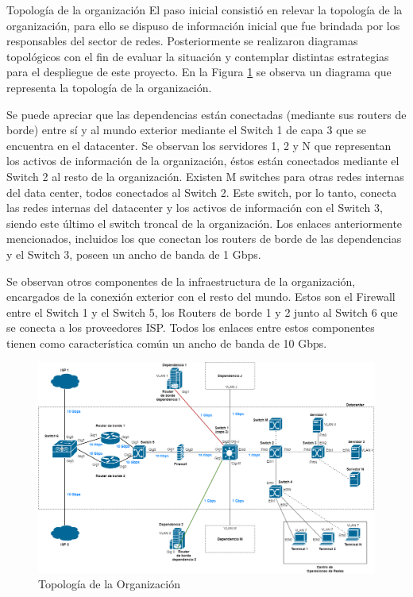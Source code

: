     \begin{section}{Topología de la organización}
    El paso inicial consistió en relevar la topología de la organización, para ello se dispuso de información inicial que fue brindada por los responsables del sector de redes. Posteriormente se realizaron diagramas topológicos con el fin de evaluar la situación y contemplar distintas estrategias para el despliegue de este proyecto.  
    En la Figura \ref{fig:iter1_top_unc} se observa un diagrama que representa la topología de la organización.\par
    Se puede apreciar que las dependencias están conectadas (mediante sus routers de borde) entre sí y al mundo exterior mediante el Switch 1 de capa 3 que se encuentra en el datacenter. Se observan los servidores 1, 2 y N que representan los activos de información de la organización, éstos están conectados mediante el Switch 2 al resto de la organización. Existen M switches para otras redes internas del data center, todos conectados al Switch 2. Este switch, por lo tanto, conecta las redes internas del datacenter y los activos de información con el Switch 3, siendo este último el switch troncal de la organización. Los enlaces anteriormente mencionados, incluidos los que conectan los routers de borde de las dependencias y el Switch 3, poseen un ancho de banda de 1 Gbps.\par
    Se observan otros componentes de la infraestructura de la organización, encargados de la conexión exterior con el resto del mundo. Estos son el Firewall entre el Switch 1 y el Switch 5, los Routers de borde 1 y 2 junto al Switch 6 que se conecta a los proveedores ISP. Todos los enlaces entre estos componentes tienen como característica común un ancho de banda de 10 Gbps. \par
    \begin{figure}[H]
    \centering
    \includegraphics[width=1\textwidth]{./iteracion_1_imagenes/figura_topologia_UNC.png}
    \caption{Topología de la Organización}
    \label{fig:iter1_top_unc}
    \end{figure}
    \FloatBarrier
    \end{section}
